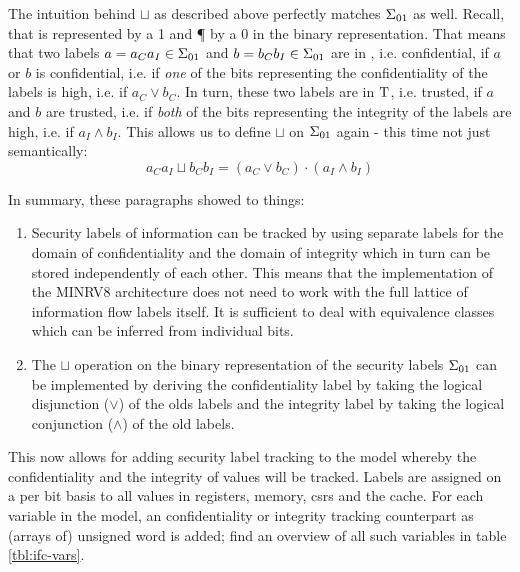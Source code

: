The intuition behind $ \sqcup $ as described above perfectly matches $ \Sigma_{01} $ as well.
Recall, that \C{} is represented by a 1 and \P{} by a 0 in the binary representation.
That means that two labels $ a = a_Ca_I \in \Sigma_{01} $ and $ b = b_Cb_I \in \Sigma_{01} $ are in \C{}, i.e. confidential, if $ a $ or $ b $ is confidential, i.e. if \textit{one} of the bits representing the confidentiality of the labels is high, i.e. if $ a_C \lor b_C $.
In turn, these two labels are in $ \text{T} $, i.e. trusted, if $ a $ and $ b $ are trusted, i.e. if \textit{both} of the bits representing the integrity of the labels are high, i.e. if $ a_I \land b_I $.
This allows us to define $ \sqcup $ on $ \Sigma_{01} $ again - this time not just semantically:
\begin{equation*}
    a_C a_I \sqcup b_C b_I = (a_C \lor b_C) \cdot (a_I \land b_I)
\end{equation*}

In summary, these paragraphs showed to things:
\begin{enumerate}
    \item Security labels of information can be tracked by using separate labels for the domain of confidentiality and the domain of integrity which in turn can be stored independently of each other.
    This means that the implementation of the MINRV8 architecture does not need to work with the full lattice of information flow labels itself.
    It is sufficient to deal with equivalence classes which can be inferred from individual bits.
    \item The $ \sqcup $ operation on the binary representation of the security labels $ \Sigma_{01} $ can be implemented by deriving the confidentiality label by taking the logical disjunction ($ \lor $) of the olds labels and the integrity label by taking the logical conjunction ($ \land $) of the old labels.
\end{enumerate}

This now allows for adding security label tracking to the model whereby the confidentiality and the integrity of values will be tracked.
Labels are assigned on a per bit basis to all values in registers, memory, \glspl{csr} and the cache.
For each variable in the model, an confidentiality or integrity tracking counterpart as (arrays of) unsigned word is added; find an overview of all such variables in table \ref{tbl:ifc-vars}.

